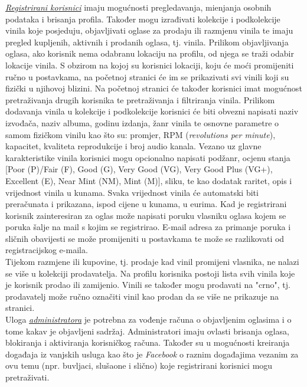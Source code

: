 	 \textit{\underline{Registrirani korisnici}} imaju mogućnosti pregledavanja, mienjanja osobnih podataka i brisanja profila. Također mogu izrađivati kolekcije i podkolekcije vinila koje posjeduju, objavljivati oglase za prodaju ili razmjenu vinila te imaju pregled kupljenih, aktivnih i prodanih oglasa, tj. vinila. Prilikom objavljivanja oglasa, ako korisnik nema odabranu lokaciju na profilu, od njega se traži odabir lokacije vinila. S obzirom na kojoj su korisnici lokaciji, koju će moći promijeniti ručno u postavkama, na početnoj stranici će im se prikazivati svi vinili koji su fizički u njihovoj blizini. Na početnoj stranici će također korisnici imat mogućnost pretraživanja drugih korisnika te pretraživanja i filtriranja vinila. Prilikom dodavanja vinila u kolekcije i podkolekcije korisnici će biti obvezni napisati naziv izvođača, naziv albuma, godinu izdanja, žanr vinila te osnovne parametre o samom fizičkom vinilu kao što su: promjer, RPM (\textit{revolutions per minute}), kapacitet, kvaliteta reprodukcije i broj audio kanala. Vezano uz glavne karakteristike vinila korisnici mogu opcionalno napisati podžanr, ocjenu stanja [Poor (P)/Fair (F), Good (G), Very Good (VG), Very Good Plus (VG+), Excellent (E), Near Mint (NM), Mint (M)], sliku, te kao dodatak raritet, opis i vrijednost vinila u kunama. Svaka vrijednost vinila će automatski biti preračunata i prikazana, ispod cijene u kunama, u eurima. Kad je registrirani korisnik zainteresiran za oglas može napisati poruku vlasniku oglasa kojem se poruka šalje na mail s kojim se registrirao. E-mail adresa za primanje poruka i sličnih obavijesti se može promijeniti u postavkama te može se razlikovati od registracijskog e-maila.\\
	 
	  \text Tijekom razmjene ili kupovine, tj. prodaje kad vinil promijeni vlasnika, ne nalazi se više u kolekciji prodavatelja. Na profilu korisnika postoji lista svih vinila koje je korisnik prodao ili zamijenio. Vinili se također mogu prodavati na "crno", tj. prodavatelj može ručno označiti vinil kao prodan da se više ne prikazuje na stranici.\\
	 
	 Uloga \textit{\underline{administratora}} je potrebna za vođenje računa o objavljenim oglasima i o tome kakav je objavljeni sadržaj. Administratori imaju ovlasti brisanja oglasa, blokiranja i aktiviranja korisničkog računa. Također su u mogućnosti kreiranja događaja iz vanjskih usluga kao što je \textit{Facebook} o raznim događajima vezanim za ovu temu (npr. buvljaci, slušaone i slično) koje registrirani korisnici mogu pretraživati.\\
	 
